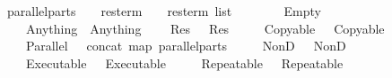 \ parallel{\isacharunderscore}parts\ {\isacharcolon}{\isacharcolon}\ {\isachardoublequoteopen}{\isacharparenleft}\ \ res{\isacharunderscore}term\ {\isasymRightarrow}\ {\isacharparenleft}\ \ res{\isacharunderscore}term\ list{\isachardoublequoteclose}\isanewline
\ \ \isanewline
\ \ \ \ {\isachardoublequoteopen}\ Empty\ {\isacharequal}\ {\isacharbrackleft}{\isacharbrackright}{\isachardoublequoteclose}\isanewline
\ \ {\isacharbar}\ {\isachardoublequoteopen}\ Anything\ {\isacharequal}\ {\isacharbrackleft}Anything{\isacharbrackright}{\isachardoublequoteclose}\isanewline
\ \ {\isacharbar}\ {\isachardoublequoteopen}\ {\isacharparenleft}Res\ \ {\isacharequal}\ {\isacharbrackleft}Res\ \isanewline
\ \ {\isacharbar}\ {\isachardoublequoteopen}\ {\isacharparenleft}Copyable\ \ {\isacharequal}\ {\isacharbrackleft}Copyable\ \isanewline
\ \ {\isacharbar}\ {\isachardoublequoteopen}\ {\isacharparenleft}Parallel\ \ {\isacharequal}\ concat\ {\isacharparenleft}map\ parallel{\isacharunderscore}parts\ \isanewline
\ \ {\isacharbar}\ {\isachardoublequoteopen}\ {\isacharparenleft}NonD\ \ {\isacharequal}\ {\isacharbrackleft}NonD\ \isanewline
\ \ {\isacharbar}\ {\isachardoublequoteopen}\ {\isacharparenleft}Executable\ \ {\isacharequal}\ {\isacharbrackleft}Executable\ \isanewline
\ \ {\isacharbar}\ {\isachardoublequoteopen}\ {\isacharparenleft}Repeatable\ \ {\isacharequal}\ {\isacharbrackleft}Repeatable\ %
